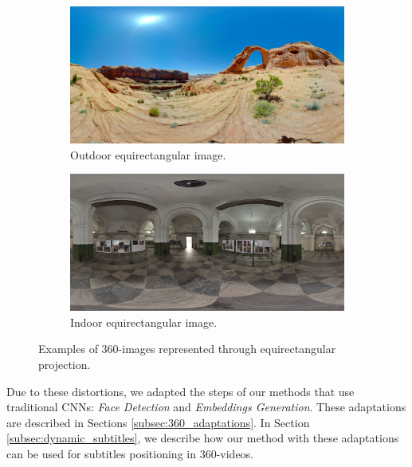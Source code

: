 \begin{figure}[!ht]
\centering
    \begin{subfigure}{0.47\linewidth}
        \centering
        \includegraphics[width=1\textwidth]{img/image (9).jpg}
        \caption{Outdoor equirectangular image.}
        \label{subfig:out_equi}
    \end{subfigure}\hfill
    \begin{subfigure}{0.47\linewidth}
        \centering
        \includegraphics[width=1\textwidth]{img/image (10).JPG}
        \caption{Indoor equirectangular image.}
        \label{subfig:in_equi}
    \end{subfigure}

\caption{Examples of 360-images represented through equirectangular projection.}
\label{fig:equirectangular_proj}
\end{figure}

Due to these distortions, we adapted the steps of our methods that use traditional CNNs: \emph{Face Detection} and \emph{Embeddings Generation}. These adaptations are described in Sections \ref{subsec:360_adaptations}. In Section \ref{subsec:dynamic_subtitles}, we describe how our method with these adaptations can be used for subtitles positioning in 360-videos.

